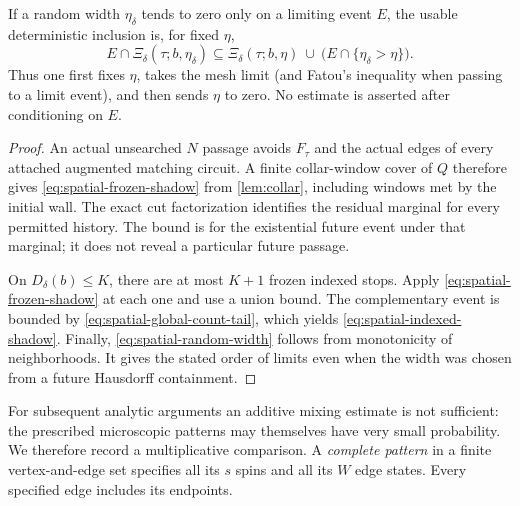 \begin{corollary}
If a random width $\eta_\delta$ tends to zero only on a limiting
event $E$, the usable deterministic inclusion is, for fixed $\eta$,
\begin{equation}\label{eq:spatial-random-width}
 E\cap\Xi_\delta(\tau;b,\eta_\delta)
 \subseteq
 \Xi_\delta(\tau;b,\eta)\ \cup\
       \bigl(E\cap\{\eta_\delta>\eta\}\bigr).
\end{equation}
Thus one first fixes $\eta$, takes the mesh limit (and Fatou's
inequality when passing to a limit event), and then sends $\eta$ to
zero. No estimate is asserted after conditioning on $E$.
\end{corollary}

\begin{proof}
An actual unsearched $N$ passage avoids $F_\tau$ and the actual
edges of every attached augmented matching circuit. A finite
collar-window cover of $Q$ therefore gives
\eqref{eq:spatial-frozen-shadow} from \cref{lem:collar}, including
windows met by the initial wall. The exact cut factorization
identifies the residual marginal for every permitted history.
The bound is for the existential future event under that marginal;
it does not reveal a particular future passage.

On $D_\delta(b)\le K$, there are at most $K+1$ frozen indexed
stops. Apply \eqref{eq:spatial-frozen-shadow} at each one and use
a union bound. The complementary event is bounded by
\eqref{eq:spatial-global-count-tail}, which yields
\eqref{eq:spatial-indexed-shadow}. Finally,
\eqref{eq:spatial-random-width} follows from monotonicity of
neighborhoods. It gives the stated order of limits even when the
width was chosen from a future Hausdorff containment.
\end{proof}

For subsequent analytic arguments an additive mixing estimate is
not sufficient: the prescribed microscopic patterns may themselves
have very small probability. We therefore record a multiplicative
comparison. A \emph{complete pattern} in a finite vertex-and-edge
set specifies all its $s$ spins and all its $W$ edge states. Every
specified edge includes its endpoints.

